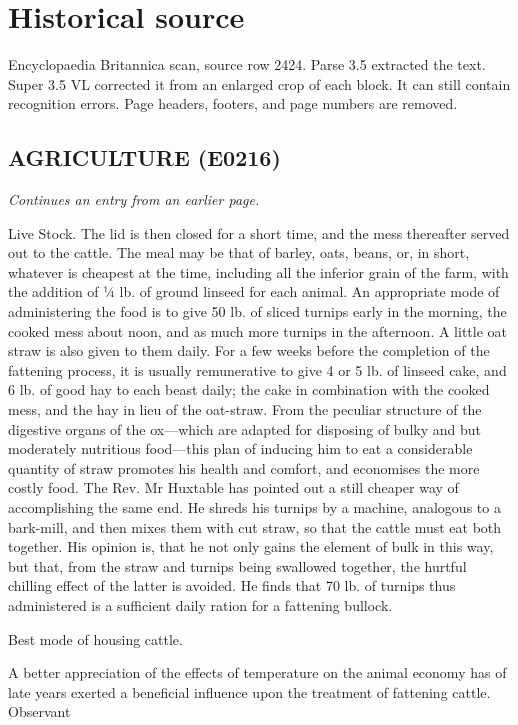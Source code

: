 \documentclass{article}
\begin{document}
\section*{Historical source}
Encyclopaedia Britannica scan, source row 2424. Parse 3.5 extracted the text. Super 3.5 VL corrected it from an enlarged crop of each block. It can still contain recognition errors.
Page headers, footers, and page numbers are removed.

\subsection*{AGRICULTURE (E0216)}
\textit{Continues an entry from an earlier page.}

Live Stock. The lid is then closed for a short time, and the mess thereafter served out to the cattle. The meal may be that of barley, oats, beans, or, in short, whatever is cheapest at the time, including all the inferior grain of the farm, with the addition of ¼ lb. of ground linseed for each animal. An appropriate mode of administering the food is to give 50 lb. of sliced turnips early in the morning, the cooked mess about noon, and as much more turnips in the afternoon. A little oat straw is also given to them daily. For a few weeks before the completion of the fattening process, it is usually remunerative to give 4 or 5 lb. of linseed cake, and 6 lb. of good hay to each beast daily; the cake in combination with the cooked mess, and the hay in lieu of the oat-straw. From the peculiar structure of the digestive organs of the ox—which are adapted for disposing of bulky and but moderately nutritious food—this plan of inducing him to eat a considerable quantity of straw promotes his health and comfort, and economises the more costly food. The Rev. Mr Huxtable has pointed out a still cheaper way of accomplishing the same end. He shreds his turnips by a machine, analogous to a bark-mill, and then mixes them with cut straw, so that the cattle must eat both together. His opinion is, that he not only gains the element of bulk in this way, but that, from the straw and turnips being swallowed together, the hurtful chilling effect of the latter is avoided. He finds that 70 lb. of turnips thus administered is a sufficient daily ration for a fattening bullock.

Best mode of housing cattle.

A better appreciation of the effects of temperature on the animal economy has of late years exerted a beneficial influence upon the treatment of fattening cattle. Observant
\end{document}

